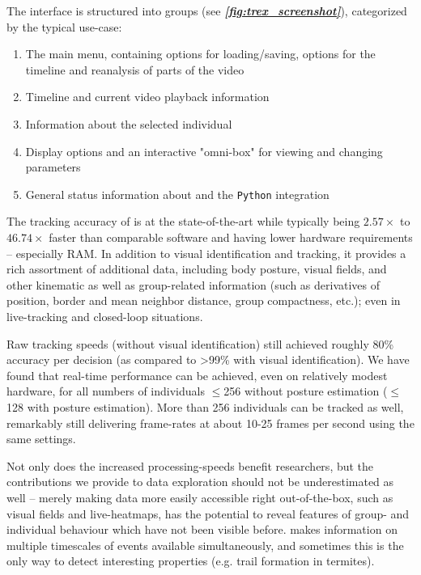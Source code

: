 \documentclass[9pt,lineno]{elife}
\newcommand{\figref}[1]{\textit{\textbf{\ref{#1}}}}
\newcommand{\TRex}{\protect\path{TRex}}
\newcommand{\changemade}[1]{#1}
\begin{document}
The interface is structured into groups (see \figref{fig:trex_screenshot}), categorized by the typical use-case:

\begin{enumerate}
    \item The main menu, containing options for loading/saving, options for the timeline and reanalysis of parts of the video
    \item Timeline and current video playback information
    \item Information about the selected individual
    \item Display options and an interactive "omni-box" for viewing and changing parameters
    \item General status information about \TRex{} and the \texttt{Python} integration
\end{enumerate}

The tracking accuracy of \TRex{} is at the state-of-the-art while typically being $2.57\times$ to $46.74\times$ faster than comparable software and having lower hardware requirements -- \changemade{especially} RAM. In addition to visual identification and tracking, it provides a rich assortment of additional data, including body posture, visual fields, and other kinematic as well as group-related information (such as derivatives of position, border and mean neighbor distance, group compactness, etc.); even in live-tracking and closed-loop situations. 

Raw tracking speeds (without visual identification) still achieved roughly 80\% accuracy per decision (as compared to >99\% with visual identification). We have found that real-time performance can be achieved, even on relatively modest hardware, for all numbers of individuals $\leq$256 without posture estimation ($\leq$ 128 with posture estimation). More than 256 individuals can be tracked as well, remarkably still delivering frame-rates at about 10-25 frames per second using the same settings.

Not only does the increased processing-speeds benefit researchers, but the contributions we provide to data exploration should not be underestimated as well -- merely making data more easily accessible right out-of-the-box, such as visual fields and live-heatmaps, has the potential to reveal features of group- and individual behaviour which have not been visible before. \TRex{} makes information on multiple timescales of events available simultaneously, and sometimes this is the only way to detect interesting properties (e.g. trail formation in termites).
\end{document}
